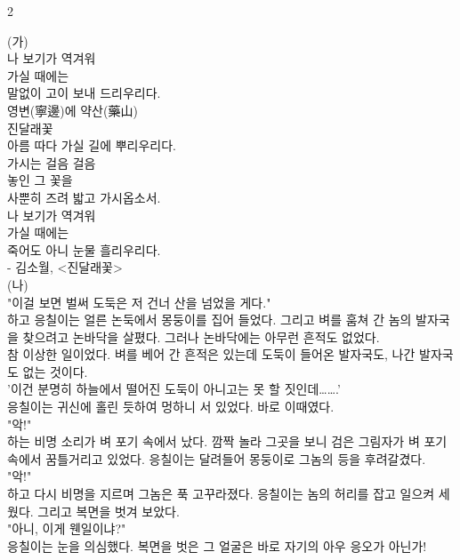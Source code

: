 \documentclass[10pt, a4paper]{article}
\begin{document}
\begin{multicols}{2}


\vspace{1mm}
\vspace{0.5mm}

\begin{passagebox}
\noindent{}(가) \\
나 보기가 역겨워 \\
가실 때에는 \\
말없이 고이 보내 드리우리다.
\\[0.5em]
영변(寧邊)에 약산(藥山) \\
진달래꽃 \\
아름 따다 가실 길에 뿌리우리다.
\\[0.5em]
가시는 걸음 걸음 \\
놓인 그 꽃을 \\
사뿐히 즈려 밟고 가시옵소서.
\\[0.5em]
나 보기가 역겨워 \\
가실 때에는 \\
죽어도 아니 눈물 흘리우리다.
\\[0.5em]
- 김소월, <진달래꽃>
\\[0.5em]
(나) \\
"이걸 보면 벌써 도둑은 저 건너 산을 넘었을 게다." \\
하고 응칠이는 얼른 논둑에서 몽둥이를 집어 들었다. 그리고 벼를 훔쳐 간 놈의 발자국을 찾으려고 논바닥을 살폈다. 그러나 논바닥에는 아무런 흔적도 없었다. \\
참 이상한 일이었다. 벼를 베어 간 흔적은 있는데 도둑이 들어온 발자국도, 나간 발자국도 없는 것이다. \\
'이건 분명히 하늘에서 떨어진 도둑이 아니고는 못 할 짓인데…….' \\
응칠이는 귀신에 홀린 듯하여 멍하니 서 있었다. 바로 이때였다. \\
"악!" \\
하는 비명 소리가 벼 포기 속에서 났다. 깜짝 놀라 그곳을 보니 검은 그림자가 벼 포기 속에서 꿈틀거리고 있었다. 응칠이는 달려들어 몽둥이로 그놈의 등을 후려갈겼다. \\
"악!" \\
하고 다시 비명을 지르며 그놈은 푹 고꾸라졌다. 응칠이는 놈의 허리를 잡고 일으켜 세웠다. 그리고 복면을 벗겨 보았다. \\
"아니, 이게 웬일이냐?" \\
응칠이는 눈을 의심했다. 복면을 벗은 그 얼굴은 바로 자기의 아우 응오가 아닌가! \\

\end{passagebox}
\end{multicols}
\end{document}
